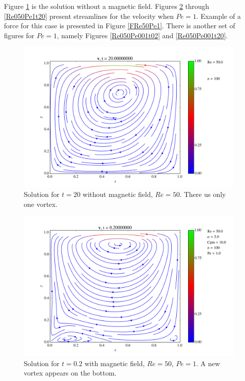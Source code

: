 \documentclass[journal]{IEEEtran}
\begin{document}
Figure \ref{Re050nVectorField} is the solution without a magnetic field. Figures \ref{Re050Pe1t02} through \ref{Re050Pe1t20} present streamlines for the velocity when $\mathit{Pe}=1$. Example of a force for this case is presented in Figure \ref{FRe50Pe1}. There is another set of figures for $\mathit{Pe}=1$, namely Figures \ref{Re050Pe001t02} and \ref{Re050Pe001t20}.

\begin{figure}[!t]
\centering
\includegraphics[width=\linewidth]{figures/NoMagRe50/Re50N100_t20}
\caption{Solution for $t=20$ without magnetic field, $\mathit{Re}=50$. There us only one vortex.\label{Re050nVectorField}}
\end{figure}

\begin{figure}[!t]
\centering
\includegraphics[width=\linewidth]{figures/MagRe50Pe1/Re50Pe1_t02}
\caption{Solution for $t=0.2$ with magnetic field, $\mathit{Re}=50$, $\mathit{Pe}=1$. A new vortex appears on the bottom. \label{Re050Pe1t02}}
\end{figure}
\end{document}
